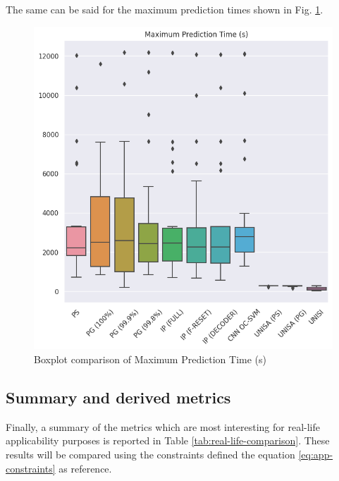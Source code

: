 The same can be said for the maximum prediction times shown in Fig. \ref{fig:boxplot_MPT}.

\begin{figure}[ht]
    \centering
    \includegraphics[width=1.0\textwidth]{images/Experimental-validation/boxplot_MPT.png}
    \caption{Boxplot comparison of Maximum Prediction Time (s)}
    \label{fig:boxplot_MPT}
\end{figure}

\clearpage
\subsection{Summary and derived metrics}
Finally, a summary of the metrics which are most interesting for real-life applicability purposes is reported in Table \ref{tab:real-life-comparison}. These results will be compared using the constraints defined the equation \ref{eq:app-constraints} as reference.


